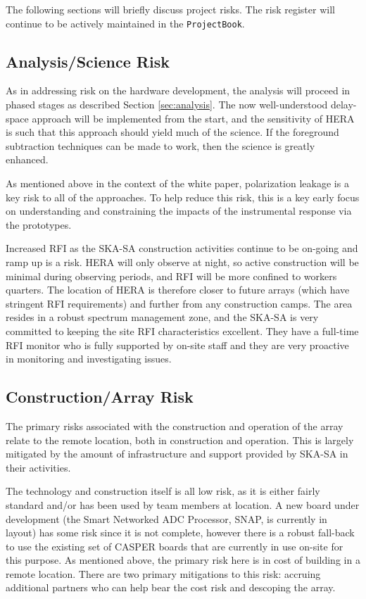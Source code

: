 \documentclass[preprint]{aastex}
\begin{document}
The following sections will briefly discuss project risks.  The risk register will continue to be
actively maintained in the {\tt ProjectBook}.

\subsection{Analysis/Science Risk}
As in addressing risk on the hardware development, the analysis will proceed in
phased stages as described Section \ref{sec:analysis}. The now well-understood
delay-space approach will be implemented from the start, and the sensitivity of HERA
is such that this approach should yield much of the science. If the foreground
subtraction techniques can be made to work, then the science is greatly enhanced.

As mentioned above in the context of the white paper, polarization leakage is a key
risk to all of the approaches.  To help reduce this risk, this is a key early focus on understanding and
constraining the impacts of the instrumental response via the prototypes.

Increased RFI as the SKA-SA construction activities continue to be on-going and 
ramp up is a risk.  HERA will only observe at night, so active construction will be
minimal during observing periods, and RFI will be more confined to workers quarters.
The location of HERA is therefore closer to future arrays (which have stringent
RFI requirements) and further from any construction camps.  The area resides in
a robust spectrum management zone, and the SKA-SA is very committed to
keeping the site RFI characteristics excellent.  They have a full-time RFI monitor
who is fully supported by on-site staff and they are very proactive in monitoring
and investigating issues.

\subsection{Construction/Array Risk}
The primary risks associated with the construction and operation of the array relate
to the remote location, both in construction and operation. This is largely mitigated
by the amount of infrastructure and support provided by SKA-SA in their activities.

The technology and construction itself is all low risk, as it is either fairly standard and/or
has been used by team members at location.  A new board under development (the Smart Networked
ADC Processor, SNAP, is currently in layout) has some risk since it is not complete, however there
is a robust fall-back to use the existing set of CASPER boards that are currently in use on-site for this
purpose.  As mentioned above, the primary risk here is in cost of building in a remote location.
There are two primary mitigations to this risk:  accruing additional partners who can help bear
the cost risk and descoping the array.
\end{document}
